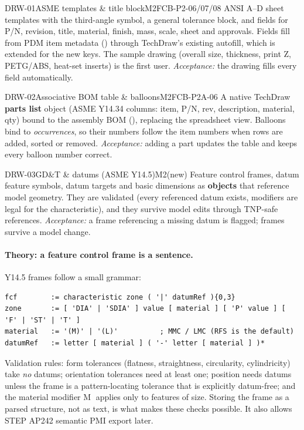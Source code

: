 \begin{epic}{DRW-01}{ASME templates \& title block}{M2}{\stTodo}{FCB-P2-06/07/08}
ANSI A--D sheet templates with the third-angle symbol, a general tolerance block, and fields for P/N, revision,
title, material, finish, mass, scale, sheet and approvals. Fields fill from PDM item metadata
() through TechDraw's existing autofill, which is extended for the new keys. The 
sample drawing (overall size, thickness, print Z, PETG/ABS, heat-set inserts) is the first user.
\emph{Acceptance:} the  drawing fills every field automatically.
\end{epic}

\begin{epic}{DRW-02}{Associative BOM table \& balloons}{M2}{\stTodo}{FCB-P2A-06}
A native TechDraw \textbf{parts list} object (ASME Y14.34 columns: item, P/N, rev, description,
material, qty) bound to the assembly BOM (), replacing the spreadsheet view. Balloons bind to
\emph{occurrences}, so their numbers follow the item numbers when rows are added, sorted or removed.
\emph{Acceptance:} adding a part updates the table and keeps every balloon number correct.
\end{epic}

\begin{epic}{DRW-03}{GD\&T \& datums (ASME Y14.5)}{M2}{\stTodo}{(new)}
Feature control frames, datum feature symbols, datum targets and basic dimensions as \textbf{objects}
that reference model geometry. They are validated (every referenced datum exists, modifiers are legal for the
characteristic), and they survive model edits through TNP-safe references.
\emph{Acceptance:} a frame referencing a missing datum is flagged; frames survive a model change.
\end{epic}

\paragraph{Theory: a feature control frame is a sentence.} Y14.5 frames follow a small grammar:
\begin{lstlisting}
fcf        := characteristic zone ( '|' datumRef ){0,3}
zone       := [ 'DIA' | 'SDIA' ] value [ material ] [ 'P' value ] [ 'F' | 'ST' | 'T' ]
material   := '(M)' | '(L)'          ; MMC / LMC (RFS is the default)
datumRef   := letter [ material ] ( '-' letter [ material ] )*
\end{lstlisting}
Validation rules: form tolerances (flatness, straightness, circularity, cylindricity) take \emph{no} datums;
orientation tolerances need at least one; position needs datums unless the frame is a pattern-locating tolerance
that is explicitly datum-free; and the material modifier \textcircled{\small M} applies only to features of size. Storing the
frame as a parsed structure, not as text, is what makes these checks possible. It also allows STEP AP242
semantic PMI export later.

